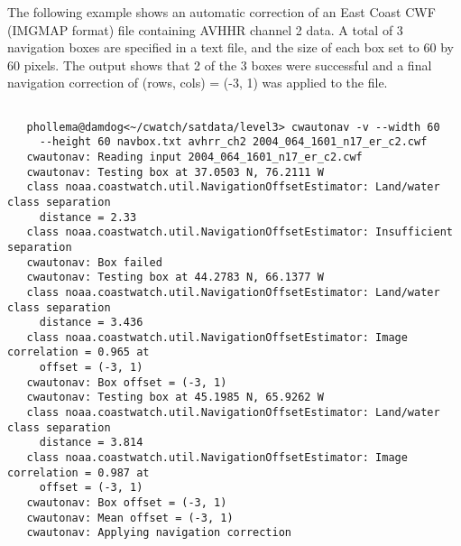  The following example shows an automatic correction of an East Coast CWF (IMGMAP format) file containing AVHHR channel 2 data. A total of 3 navigation boxes are specified in a text file, and the size of each box set to 60 by 60 pixels. The output shows that 2 of the 3 boxes were successful and a final navigation correction of (rows, cols) = (-3, 1) was applied to the file. \begin{verbatim}

   phollema@damdog<~/cwatch/satdata/level3> cwautonav -v --width 60 
     --height 60 navbox.txt avhrr_ch2 2004_064_1601_n17_er_c2.cwf
   cwautonav: Reading input 2004_064_1601_n17_er_c2.cwf
   cwautonav: Testing box at 37.0503 N, 76.2111 W
   class noaa.coastwatch.util.NavigationOffsetEstimator: Land/water class separation 
     distance = 2.33
   class noaa.coastwatch.util.NavigationOffsetEstimator: Insufficient separation
   cwautonav: Box failed
   cwautonav: Testing box at 44.2783 N, 66.1377 W
   class noaa.coastwatch.util.NavigationOffsetEstimator: Land/water class separation
     distance = 3.436
   class noaa.coastwatch.util.NavigationOffsetEstimator: Image correlation = 0.965 at
     offset = (-3, 1)
   cwautonav: Box offset = (-3, 1)
   cwautonav: Testing box at 45.1985 N, 65.9262 W
   class noaa.coastwatch.util.NavigationOffsetEstimator: Land/water class separation 
     distance = 3.814
   class noaa.coastwatch.util.NavigationOffsetEstimator: Image correlation = 0.987 at
     offset = (-3, 1)
   cwautonav: Box offset = (-3, 1)
   cwautonav: Mean offset = (-3, 1)
   cwautonav: Applying navigation correction
 
\end{verbatim}
